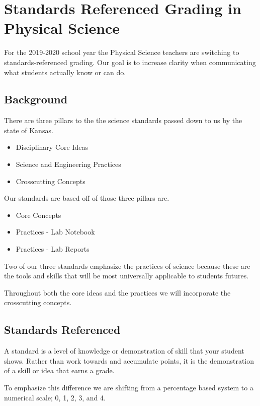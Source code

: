 \documentclass[14pt, fleqn, paper=letter, oneside]{scrartcl}
\newcommand{\maintitle}{Standards Referenced Grading in Physical Science}
\begin{document}
\section*{\maintitle}

\begin{multicols}{2}
For the 2019-2020 school year the Physical Science teachers are switching to standards-referenced grading.
Our goal is to increase clarity when communicating what students actually know or can do.

\subsection*{Background}
There are three pillars to the the science standards passed down to us by the state of Kansas.

\begin{itemize}
  \item Disciplinary Core Ideas
  \item Science and Engineering Practices
  \item Crosscutting Concepts
\end{itemize}

Our standards are based off of those three pillars are.

\begin{itemize}
\item Core Concepts
\item Practices - Lab Notebook
\item Practices - Lab Reports
\end{itemize}

Two of our three standards emphasize the practices of science because these are the tools and skills that will be most universally applicable to students futures.

Throughout both the core ideas and the practices we will incorporate the crosscutting concepts.


\subsection*{Standards Referenced}
A standard is a level of knowledge or demonstration of skill that your student shows.
Rather than work towards and accumulate points, it is the demonstration of a skill or idea that earns a grade.

To emphasize this difference we are shifting from a percentage based system to a numerical scale; 0, 1, 2, 3, and 4.


\end{multicols}
\end{document}
